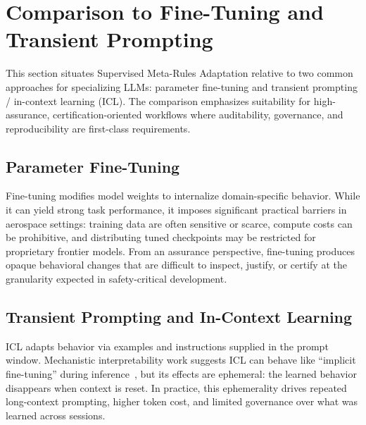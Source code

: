 \documentclass[conference]{IEEEtran}
\begin{document}

\section{Comparison to Fine-Tuning and Transient Prompting}
\label{sec:comparison}

This section situates Supervised Meta-Rules Adaptation relative to two common approaches for specializing LLMs: parameter fine-tuning and transient prompting / in-context learning (ICL). The comparison emphasizes suitability for high-assurance, certification-oriented workflows where auditability, governance, and reproducibility are first-class requirements.

\subsection{Parameter Fine-Tuning}
Fine-tuning modifies model weights to internalize domain-specific behavior. While it can yield strong task performance, it imposes significant practical barriers in aerospace settings: training data are often sensitive or scarce, compute costs can be prohibitive, and distributing tuned checkpoints may be restricted for proprietary frontier models. From an assurance perspective, fine-tuning produces opaque behavioral changes that are difficult to inspect, justify, or certify at the granularity expected in safety-critical development.

\subsection{Transient Prompting and In-Context Learning}
ICL adapts behavior via examples and instructions supplied in the prompt window. Mechanistic interpretability work suggests ICL can behave like ``implicit fine-tuning'' during inference~\cite{vonoswald2023transformers}, but its effects are ephemeral: the learned behavior disappears when context is reset. In practice, this ephemerality drives repeated long-context prompting, higher token cost, and limited governance over what was learned across sessions.
\end{document}
